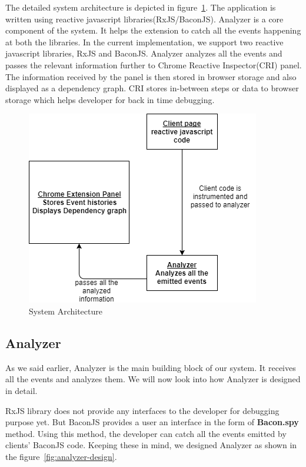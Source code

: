 The detailed system architecture is depicted in figure~\ref{fig:system-architecture}. The application is written using reactive javascript libraries(RxJS/BaconJS). Analyzer is a core component of the system. It helps the extension to catch all the events happening at both the libraries. In the current implementation, we support two reactive javascript libraries, RxJS and BaconJS. Analyzer analyzes all the events and passes the relevant information further to Chrome Reactive Inspector(CRI) panel. The information received by the panel is then stored in browser storage and also displayed as a dependency graph. CRI stores in-between steps or data to browser storage which helps developer for back in time debugging.

\begin{figure}[!h]
	\centering
	\includegraphics[scale=0.5,trim=0 0 0 0]{images/system-architecture.png}
	\caption{System Architecture}
	\label{fig:system-architecture}
\end{figure}

\subsection{Analyzer}
As we said earlier, Analyzer is the main building block of our system. It receives all the events and analyzes them. We will now look into how Analyzer is designed in detail.

RxJS library does not provide any interfaces to the developer for debugging purpose yet. But BaconJS provides a user an interface in the form of \textbf{Bacon.spy} method. Using this method, the developer can catch all the events emitted by clients' BaconJS code. Keeping these in mind, we designed Analyzer as shown in the figure~\ref{fig:analyzer-design}. 

